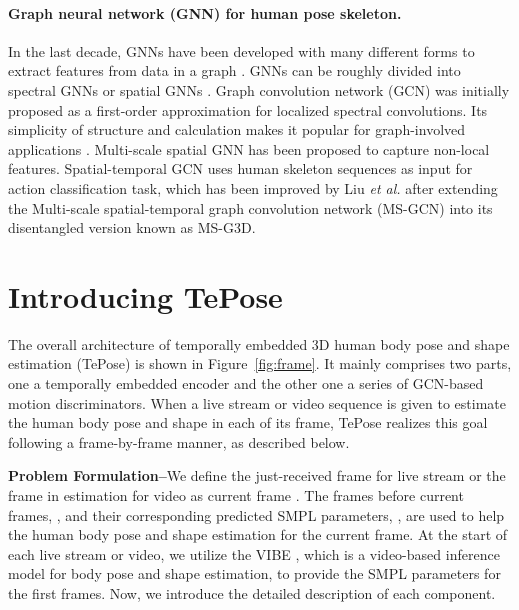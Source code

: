\documentclass[10pt,twocolumn,letterpaper]{article}
\newcommand{\figref}[1]{Figure~\ref{fig:#1}}
\begin{document}
\paragraph{Graph neural network (GNN) for human pose skeleton.}
In the last decade, GNNs have been developed with many different forms to extract features from data in a graph \cite{bruna2013spectral,hamilton2017inductive,kipf2016semi,velivckovic2017graph,xu2018powerful,gao2019graph}. GNNs can be roughly divided into spectral GNNs \cite{bruna2013spectral,kipf2016semi} or spatial GNNs \cite{hamilton2017inductive}. Graph convolution network (GCN) \cite{kipf2016semi} was initially proposed as a first-order approximation for localized spectral convolutions. Its simplicity of structure and calculation makes it popular for graph-involved applications \cite{wang2018videos,yu2017spatio}.
Multi-scale spatial GNN \cite{liao2019lanczosnet} has been proposed to capture non-local features. Spatial-temporal GCN \cite{yan2018spatial} uses human skeleton sequences as input for action classification task, which has been improved by Liu \textit{et al.} \cite{liu2020disentangling} after extending the Multi-scale spatial-temporal graph convolution network (MS-GCN) \cite{chaolong2018spatio} into its disentangled version known as MS-G3D.


\section{Introducing TePose}

The overall architecture of temporally embedded 3D human body pose and shape estimation (TePose) is shown in \figref{frame}. It mainly comprises two parts, one a temporally embedded encoder and the other one a series of GCN-based motion discriminators. When a live stream or video sequence is given to estimate the human body pose and shape in each of its frame, TePose realizes this goal following a frame-by-frame manner, as described below.

\textbf{Problem Formulation--}We define the just-received frame for live stream or the frame in estimation for video as current frame . The  frames before current frames, , and their corresponding predicted SMPL parameters, , are used to help  the human body pose and shape estimation for the current frame. At the start of each live stream or video, we utilize the VIBE \cite{kocabas2020vibe}, which is a video-based inference model for body pose and shape estimation, to provide the SMPL parameters for the first  frames. Now, we introduce the detailed description of each component.
\end{document}
